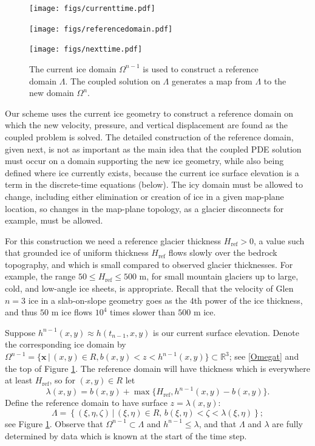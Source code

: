 \documentclass[letterpaper,final,12pt,reqno]{amsart}
\newcommand{\RR}{\mathbb{R}}
\newcommand{\bx}{\mathbf{x}}
\newcommand{\Href}{H_{\text{ref}}}
\begin{document}
\begin{figure}[ht]
\begin{center}
\texttt{[image: figs/currenttime.pdf]}
\vspace{-6mm}

\texttt{[image: figs/referencedomain.pdf]}
\vspace{-1mm}

\texttt{[image: figs/nexttime.pdf]}
\end{center}
\caption{The current ice domain $\Omega^{n-1}$ is used to construct a reference domain $\Lambda$.  The coupled solution on $\Lambda$ generates a map from $\Lambda$ to the new domain $\Omega^n$.}
\label{fig:domainupdate}
\end{figure}

Our scheme uses the current ice geometry to construct a reference domain on which the new velocity, pressure, and vertical displacement are found as the coupled problem is solved.  The detailed construction of the reference domain, given next, is not as important as the main idea that the coupled PDE solution must occur on a domain supporting the new ice geometry, while also being defined where ice currently exists, because the current ice surface elevation is a term in the discrete-time equations (below).  The icy domain must be allowed to change, including either elimination or creation of ice in a given map-plane location, so changes in the map-plane topology, as a glacier disconnects for example, must be allowed.

For this construction we need a reference glacier thickness $\Href>0$, a value such that grounded ice of uniform thickness $\Href$ flows slowly over the bedrock topography, and which is small compared to observed glacier thicknesses.  For example, the range $50 \le \Href \le 500$ m, for small mountain glaciers up to large, cold, and low-angle ice sheets, is appropriate.  Recall that the velocity of Glen $n=3$ ice in a slab-on-slope geometry \cite{GreveBlatter2009} goes as the $4$th power of the ice thickness, and thus $50$ m ice flows $10^4$ times slower than $500$ m ice.

Suppose $h^{n-1}(x,y) \approx h(t_{n-1},x,y)$ is our current surface elevation.  Denote the corresponding ice domain by $\Omega^{n-1}=\{\bx\,\big|\,(x,y)\in R, b(x,y)<z<h^{n-1}(x,y)\} \subset \RR^3$; see \eqref{Omegat} and the top of Figure \ref{fig:domainupdate}.  The reference domain will have thickness which is everywhere at least $\Href$, so for $(x,y) \in R$ let
\begin{equation}
\lambda(x,y) = b(x,y) + \max\{\Href,h^{n-1}(x,y)-b(x,y)\}. \label{definelambda}
\end{equation}
Define the reference domain to have surface $z=\lambda(x,y)$:
\begin{equation}
\Lambda = \left\{(\xi,\eta,\zeta)\,\big|\,(\xi,\eta)\in R, \, b(\xi,\eta) < \zeta < \lambda(\xi,\eta)\right\};  \label{Lambda}
\end{equation}
see Figure \ref{fig:domainupdate}.  Observe that $\Omega^{n-1} \subset \Lambda$ and $h^{n-1} \le \lambda$, and that $\Lambda$ and $\lambda$ are fully determined by data which is known at the start of the time step.
\end{document}
